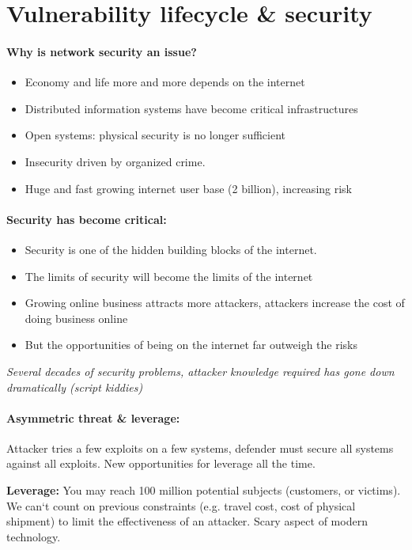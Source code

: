 \section{Vulnerability lifecycle \& security}

\paragraph{Why is network security an issue?}
\begin{itemize}
\item Economy and life more and more depends on the internet
\item Distributed information systems have become critical infrastructures
\item Open systems: physical security is no longer sufficient
\item Insecurity driven by organized crime.
\item Huge and fast growing internet user base (2 billion), increasing risk
\end{itemize}

\paragraph{Security has become critical:}
\begin{itemize}
\item Security is one of the hidden building blocks of the internet.
\item The limits of security will become the limits of the internet
\item Growing online business attracts more attackers, attackers increase
the cost of doing business online
\item But the opportunities of being on the internet far outweigh the risks
\end{itemize}
\emph{Several decades of security problems, attacker knowledge
required has gone down dramatically (script kiddies)}

\paragraph{Asymmetric threat \& leverage:}
Attacker tries a few
exploits on a few systems, defender must
secure all systems against all exploits. New
opportunities for leverage all the time.

\textbf{Leverage:} You may reach 100 million
potential subjects (customers, or victims).
We can‘t count on previous constraints (e.g.
travel cost, cost of physical shipment) to limit
the effectiveness of an attacker. Scary
aspect of modern technology.

